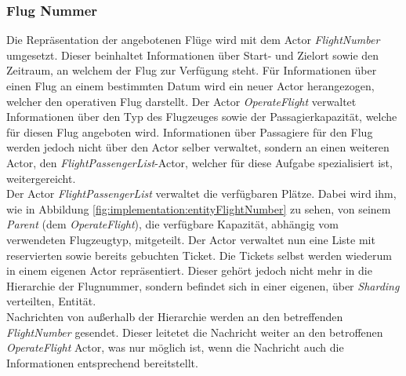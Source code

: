 \subsubsection{Flug Nummer}
Die Repräsentation der angebotenen Flüge  wird mit dem Actor \textit{FlightNumber} umgesetzt. Dieser beinhaltet Informationen über Start- und Zielort sowie den Zeitraum, an welchem der Flug zur Verfügung steht. Für Informationen über einen Flug an einem bestimmten Datum wird ein neuer Actor herangezogen, welcher den operativen Flug darstellt. Der Actor \textit{OperateFlight} verwaltet Informationen über den Typ des Flugzeuges sowie der Passagierkapazität, welche für diesen Flug angeboten wird. Informationen über Passagiere für den Flug werden jedoch nicht über den Actor selber verwaltet, sondern an einen weiteren Actor, den \textit{FlightPassengerList}-Actor, welcher für diese Aufgabe spezialisiert ist, weitergereicht. \\
% 
% 
Der Actor \textit{FlightPassengerList} verwaltet die verfügbaren Plätze. Dabei wird ihm, wie in Abbildung \ref{fig:implementation:entityFlightNumber} zu sehen, von seinem \textit{Parent} (dem \textit{OperateFlight}), die verfügbare Kapazität, abhängig vom verwendeten Flugzeugtyp, mitgeteilt. Der Actor verwaltet nun eine Liste mit reservierten sowie bereits gebuchten Ticket. Die Tickets selbst werden wiederum in einem eigenen Actor repräsentiert. Dieser gehört jedoch nicht mehr in die Hierarchie der Flugnummer, sondern befindet sich in einer eigenen, über \textit{Sharding} verteilten, Entität. \\
Nachrichten von außerhalb der Hierarchie werden an den betreffenden \textit{FlightNumber} gesendet. Dieser leitetet die Nachricht weiter an den betroffenen \textit{OperateFlight} Actor, was nur möglich ist, wenn die Nachricht auch die Informationen entsprechend bereitstellt. \\
